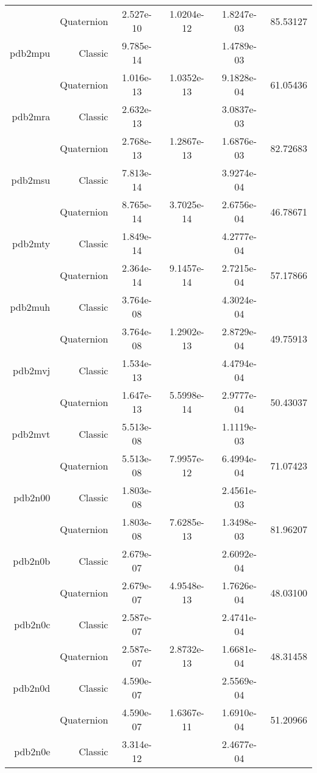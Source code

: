 \begin{xltabular}{\textwidth}{r|rS[table-format=1.3e+2]S[table-format=1.4e+2]S[table-format=1.4e+2]S[table-format=-1.5]}
& Quaternion & 2.527e-10 & 1.0204e-12 & 1.8247e-03 & 85.53127\\  \addlinespace
pdb2mpu & Classic & 9.785e-14 &  & 1.4789e-03 & \\
& Quaternion & 1.016e-13 & 1.0352e-13 & 9.1828e-04 & 61.05436\\  \addlinespace
pdb2mra & Classic & 2.632e-13 &  & 3.0837e-03 & \\
& Quaternion & 2.768e-13 & 1.2867e-13 & 1.6876e-03 & 82.72683\\  \addlinespace
pdb2msu & Classic & 7.813e-14 &  & 3.9274e-04 & \\
& Quaternion & 8.765e-14 & 3.7025e-14 & 2.6756e-04 & 46.78671\\  \addlinespace
pdb2mty & Classic & 1.849e-14 &  & 4.2777e-04 & \\
& Quaternion & 2.364e-14 & 9.1457e-14 & 2.7215e-04 & 57.17866\\  \addlinespace
pdb2muh & Classic & 3.764e-08 &  & 4.3024e-04 & \\
& Quaternion & 3.764e-08 & 1.2902e-13 & 2.8729e-04 & 49.75913\\  \addlinespace
pdb2mvj & Classic & 1.534e-13 &  & 4.4794e-04 & \\
& Quaternion & 1.647e-13 & 5.5998e-14 & 2.9777e-04 & 50.43037\\  \addlinespace
pdb2mvt & Classic & 5.513e-08 &  & 1.1119e-03 & \\
& Quaternion & 5.513e-08 & 7.9957e-12 & 6.4994e-04 & 71.07423\\  \addlinespace
pdb2n00 & Classic & 1.803e-08 &  & 2.4561e-03 & \\
& Quaternion & 1.803e-08 & 7.6285e-13 & 1.3498e-03 & 81.96207\\  \addlinespace
pdb2n0b & Classic & 2.679e-07 &  & 2.6092e-04 & \\
& Quaternion & 2.679e-07 & 4.9548e-13 & 1.7626e-04 & 48.03100\\  \addlinespace
pdb2n0c & Classic & 2.587e-07 &  & 2.4741e-04 & \\
& Quaternion & 2.587e-07 & 2.8732e-13 & 1.6681e-04 & 48.31458\\  \addlinespace
pdb2n0d & Classic & 4.590e-07 &  & 2.5569e-04 & \\
& Quaternion & 4.590e-07 & 1.6367e-11 & 1.6910e-04 & 51.20966\\  \addlinespace
pdb2n0e & Classic & 3.314e-12 &  & 2.4677e-04 & \\

\end{xltabular}
